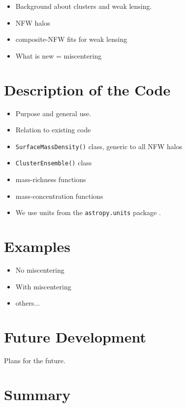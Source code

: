 \documentclass{emulateapj}
\begin{document}
\begin{itemize} \itemsep -2pt
\item Background about clusters and weak lensing.
\item NFW halos \citep{nfw97, Wright00}
\item composite-NFW fits for weak lensing \citep{Ford12, Ford14, Ford15}
\item What is new = miscentering \citep{Johnston07, George12, Ford14, Ford15}
\end{itemize}


\section{Description of the Code}
\label{code}

\begin{itemize} \itemsep -2pt
\item Purpose and general use.
\item Relation to existing code
\item \lstinline{SurfaceMassDensity()} class, generic to all NFW halos
\item \lstinline{ClusterEnsemble()} class
\item mass-richness functions
\item mass-concentration functions
\item We use units from the \lstinline{astropy.units} package \citep{astropy13}.
\end{itemize}

\section{Examples}
\label{ex}

\begin{itemize} \itemsep -2pt
\item No miscentering
\item With miscentering
\item others...
\end{itemize}

\section{Future Development}
\label{future}

Plans for the future.

\section{Summary}
\label{summary}
\end{document}
